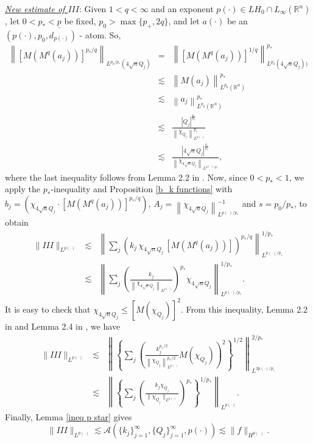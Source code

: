 \documentclass[oneside,10pt]{article}
\begin{document}
\underline{\textit{New estimate of $III$}}: Given $1 < q < \infty$ and an exponent $p(\cdot) \in LH_0 \cap L_{\infty}(\mathbb{R}^n)$, let 
$0 < p_{*} < \underline{p}$ be fixed, $p_{0} > \max \{ p_{+}, 2q \}$, and let $a(\cdot)$ be an $(p(\cdot),p_{0},d_{p(\cdot)})$ - atom. So,
\begin{eqnarray*}
\left\| [M(M^{q}(a_j))]^{p_{*}/q} \right\|_{L^{p_{0}/p_{*}}(4\sqrt{n}Q_{j})} &=& 
\left\| [M(M^{q}(a_j))]^{1/q} \right\|_{L^{p_{0}}(4\sqrt{n}Q_{j}))}^{p_{*}} \\
&\lesssim& \left\| M(a_j) \right\|_{L^{p_{0}}(\mathbb{R}^n)}^{p_{*}} \\
&\lesssim& \left\| a_j \right\|_{L^{p_{0}}(\mathbb{R}^n)}^{p_{*}} \\
&\lesssim& \frac{| Q_j |^{\frac{p_{*}}{p_{0}}}}{\left\| \chi _{Q_j }\right\|_{L^{p(\cdot)}}^{p_{*}}} \\
&\lesssim& 
\frac{\left| 4\sqrt{n}Q_{j} \right|^{\frac{p_{*}}{p_{0}}}}{\left\| \chi_{4\sqrt{n}Q_{j}} \right\|_{L^{p(\cdot)/p_{*}}}},
\end{eqnarray*}
where the last inequality follows from Lemma 2.2 in \cite{Nakai}. Now, since $0 < p_{*} < 1$, we apply the $p_{\ast}$-inequality and Proposition \ref{b_k functions} with $b_j = \left( \chi_{4\sqrt{n}Q_{j}} \cdot [M(M^{q}(a_j))]^{p_{*}/q} \right)$, 
$A_j = \left\| \chi_{4\sqrt{n}Q_{j}} \right\|_{L^{p(\cdot)/p_{*}}}^{-1}$ and $s= p_0/p_{*}$, to obtain
\begin{eqnarray*}
\| III \|_{L^{p(\cdot)}} &\lesssim& \left\| \sum_{j} \left(k_j \, \chi_{4\sqrt{n}Q_{j}} \, [M(M^{q}(a_j))] \right)^{p_{*}/q} 
\right\|^{1/p_{*}}_{L^{p(\cdot)/p_{*}}} \\
&\lesssim& \left\| \sum_{j} \left( \frac{k_j}{\left\| \chi_{4\sqrt{n}Q_{j}} \right\|_{L^{p(\cdot)}}} \right)^{p_{*}} 
\chi_{4\sqrt{n}Q_{j}} \right\|^{1/p_{*}}_{L^{p(\cdot)/p_{*}}}.
\end{eqnarray*}
It is easy to check that $\chi_{4\sqrt{n}Q_{j}} \leq [M(\chi_{Q_j})]^{2}$. From this inequality, Lemma 2.2 in \cite{Nakai} 
and Lemma 2.4 in \cite{Nakai}, we have
\begin{eqnarray*}
\| III \|_{L^{p(\cdot)}} &\lesssim& \left\| \left\{ \sum_{j} \left( \frac{k_j^{p_{*}/2}}{\left\| \chi_{Q_{j}} 
\right\|^{p_{*}/2}_{L^{p(\cdot)}}} M(\chi_{Q_j})\right)^{2}  \right\}^{1/2} \right\|^{2/p_{*}}_{L^{2p(\cdot)/p_{*}}} \\
&\lesssim& \left\| \left\{ \sum_{j} \left( \frac{ k_j \chi_{Q_j}}{\| \chi_{Q_j} \|_{L^{p(\cdot)}}} \right)^{p_{*}} 
\right\}^{1/p_{*}} \right\|_{L^{p(\cdot)}}.
\end{eqnarray*}
Finally, Lemma \ref{ineq p star} gives
\[
\| III \|_{L^{p(\cdot)}} \lesssim \mathcal{A}\left( \{ k_j \}_{j=1}^{\infty}, \{ Q_j \}_{j=1}^{\infty}, p(\cdot) \right) 
\lesssim \| f \|_{H^{p(\cdot)}}.
\]
\end{document}
